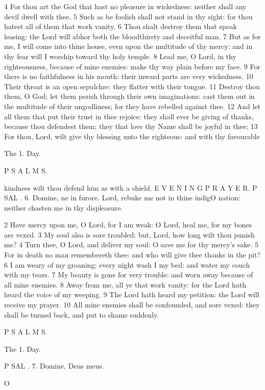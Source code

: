 4 For thou art the God that hast no pleasure in wickedness: neither shall any devil dwell with thee. 5 Such as be foolish shall not stand in thy sight: for thou hatest all of them that work vanity. 6 Thou shalt destroy them that speak leasing: the Lord will abhor both the bloodthirsty and deceitful man. 7 But as for me, I will come into thine house, even upon the multitude of thy mercy: and in thy fear will I worship toward thy holy temple. 8 Lead me, O Lord, in thy righteousness, because of mine enemies: make thy way plain before my face. 9 For there is no faithfulness in his mouth: their inward parts are very wickedness. 10 Their throat is an open sepulchre: they flatter with their tongue. 11 Destroy thou them, O God; let them perish through their own imaginations: cast them out in the multitude of their ungodliness; for they have rebelled against thee. 12 And let all them that put their trust in thee rejoice: they shall ever be giving of thanks, because thou defendest them; they that love thy Name shall be joyful in thee; 13 For thou, Lord, wilt give thy blessing unto the righteous: and with thy favourable

The 1. Day.

P S A L M S.

kindness wilt thou defend him as with a shield. E V E N I N G P R A Y E R. P SAL . 6. Domine, ne in furore. Lord, rebuke me not in thine indigO nation: neither chasten me in thy displeasure.

2 Have mercy upon me, O Lord, for I am weak: O Lord, heal me, for my bones are vexed. 3 My soul also is sore troubled: but, Lord, how long wilt thou punish me? 4 Turn thee, O Lord, and deliver my soul: O save me for thy mercy’s sake. 5 For in death no man remembereth thee: and who will give thee thanks in the pit? 6 I am weary of my groaning; every night wash I my bed: and water my couch with my tears. 7 My beauty is gone for very trouble: and worn away because of all mine enemies. 8 Away from me, all ye that work vanity: for the Lord hath heard the voice of my weeping. 9 The Lord hath heard my petition: the Lord will receive my prayer. 10 All mine enemies shall be confounded, and sore vexed: they shall be turned back, and put to shame suddenly.

P S A L M S.

The 1. Day.

P SAL . 7. Domine, Deus meus.

O

